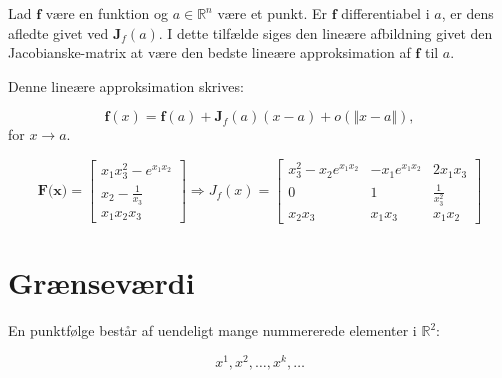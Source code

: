 \begin{definition}[]
Lad $\textbf{f}$ være en funktion og $a \in \mathbb{R}^n$ være et punkt. Er $\textbf{f}$ differentiabel i $a$, er dens afledte givet ved $\textbf{J}_f({a})$. I dette tilfælde siges den lineære afbildning givet den Jacobianske-matrix at være den bedste lineære approksimation af $\textbf{f}$ til $a$.

\hfill \break
Denne lineære approksimation skrives:

$$\textbf{f}(x)=\textbf{f}(a)+ \textbf{J}_f({a})(x-a)+ o(\left. \Vert \left. x-a \right. \Vert \right.),$$ 
for $x \to a$.

\end{definition}

\begin{definition}
\end{definition}

\begin{Example}

$$\textbf{F(x)} =
\begin{bmatrix}
x_1 x_3^2 -e^{x_1 x_2} \\
x_2 - \frac{1}{x_3} \\
x_1 x_2 x_3
\end{bmatrix} \Rightarrow
J_{f}(x) =
\begin{bmatrix}
    x_3^2 - x_2 e^{x_1 x_2} & -x_1 e^{x_1 x_2} & 2x_1 x_3 \\
    0 & 1 & \frac{1}{x_3^2}\\
    x_2 x_3 & x_1 x_3 & x_1 x_2
\end{bmatrix}$$

\end{Example}



\chapter*{Grænseværdi}

\begin{definition}[Punktfølge]
En punktfølge består af uendeligt mange nummererede elementer i $\mathbb{R}^2$:

\begin{equation}
    x^1, x^2, \hdots, x^k, \hdots
\end{equation}
\end{definition}

